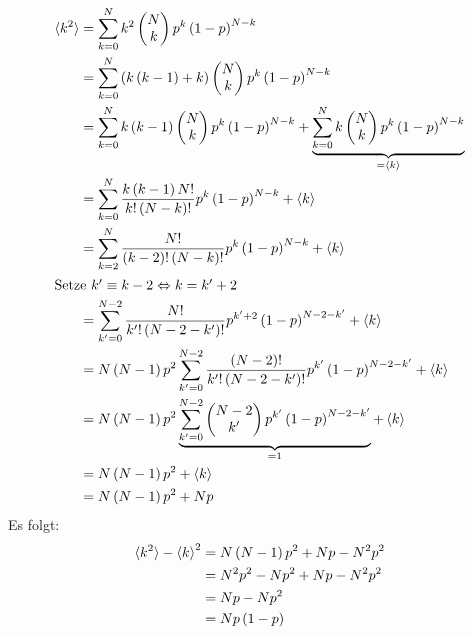 \documentclass[11pt, ngerman, fleqn, DIV=15, headinclude]{scrartcl}
\begin{document}
\begin{align*}
	\braket{k^2}&= \sum_{k=0}^N k^2
				\begin{pmatrix}
					N\\
					k			
				\end{pmatrix}
				p^k\del{1-p}^{N-k}\\
				&= \sum_{k=0}^N \del{k\del{k-1} + k}
				\begin{pmatrix}
					N\\
					k			
				\end{pmatrix}
				p^k\del{1-p}^{N-k}\\
				&= \sum_{k=0}^N k\del{k-1}
				\begin{pmatrix}
					N\\
					k			
				\end{pmatrix}
				p^k\del{1-p}^{N-k} + \underbrace{\sum_{k=0}^N k
				\begin{pmatrix}
					N\\
					k			
				\end{pmatrix}
				p^k\del{1-p}^{N-k}}_{=\braket{k}}\\
				&= \sum_{k=0}^N \frac{k\del{k-1}N!}{k!\del{N-k}!}p^k\del{1-p}^{N-k} + \braket{k}\\
				&= \sum_{k=2}^N \frac{N!}{\del{k-2}!\del{N-k}!}p^{k}\del{1-p}^{N-k} + \braket{k}\\
	\intertext{%
		Setze $k' \equiv k - 2 \Leftrightarrow k = k' + 2$
	}
				&= \sum_{k'=0}^{N-2}\frac{N!}{k'!\del{N-2-k'}!}p^{k'+2}\del{1-p}^{N-2-k'} + \braket{k}\\
				&= N\del{N-1}p^2\sum_{k'=0}^{N-2}\frac{\del{N-2}!}{k'!\del{N-2-k'}!}p^{k'}\del{1-p}^{N-2-k'} + \braket{k}\\
				&= N\del{N-1}p^2\underbrace{\sum_{k'=0}^{N-2}
				\begin{pmatrix}
					N-2\\
					k'		
				\end{pmatrix}
				p^{k'}\del{1-p}^{N-2-k'}}_{=1} + \braket{k}\\
				&= N\del{N-1}p^2 + \braket{k}\\
				&= N\del{N-1}p^2 + Np
\end{align*}
Es folgt:
\begin{align*}
	\braket{k^2} - \braket{k}^2	&= N\left( N-1 \right)p^2 + Np - N^2p^2\\
								&= N^2p^2 - Np^2 + Np - N^2p^2\\
								&= Np - Np^2\\
								&= Np\left( 1 - p \right)
\end{align*}
\end{document}
